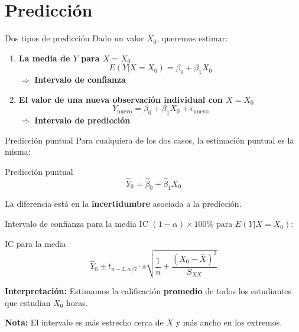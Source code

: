 \documentclass[aspectratio=169]{beamer}
\begin{document}
\section{Predicción}

\begin{frame}{Dos tipos de predicción}
Dado un valor $X_0$, queremos estimar:

\begin{enumerate}
    \item \textbf{La media de $Y$ para $X = X_0$}
    \[
    E(Y | X = X_0) = \beta_0 + \beta_1 X_0
    \]
    $\Rightarrow$ \textbf{Intervalo de confianza}
    
    \vspace{0.5cm}
    \item \textbf{El valor de una nueva observación individual con $X = X_0$}
    \[
    Y_{\text{nuevo}} = \beta_0 + \beta_1 X_0 + \epsilon_{\text{nuevo}}
    \]
    $\Rightarrow$ \textbf{Intervalo de predicción}
\end{enumerate}
\end{frame}

\begin{frame}{Predicción puntual}
Para cualquiera de los dos casos, la estimación puntual es la misma:

\begin{block}{Predicción puntual}
\[
\hat{Y}_0 = \hat{\beta}_0 + \hat{\beta}_1 X_0
\]
\end{block}

\vspace{0.5cm}
La diferencia está en la \textbf{incertidumbre} asociada a la predicción.
\end{frame}

\begin{frame}{Intervalo de confianza para la media}
IC $(1-\alpha)\times 100\%$ para $E(Y|X=X_0)$:

\begin{block}{IC para la media}
\[
\hat{Y}_0 \pm t_{n-2, \alpha/2} \cdot s \sqrt{\frac{1}{n} + \frac{(X_0 - \bar{X})^2}{S_{XX}}}
\]
\end{block}

\vspace{0.3cm}
\textbf{Interpretación:} Estimamos la calificación \textbf{promedio} de todos los estudiantes que estudian $X_0$ horas.

\vspace{0.3cm}
\textbf{Nota:} El intervalo es más estrecho cerca de $\bar{X}$ y más ancho en los extremos.
\end{frame}
\end{document}
